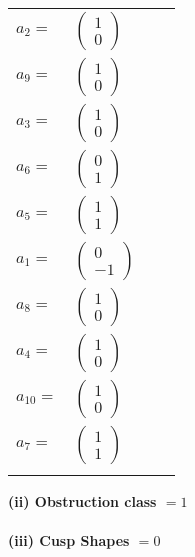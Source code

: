\documentclass[1p]{elsarticle_modified}
\theoremstyle{definition}
\begin{document}
\begin{tabular}{m{7pt} m{180pt} m{7pt} m{180pt} }
\flushright $a_{2}=$&$\begin{pmatrix}1\\0\end{pmatrix}$ \\
\flushright $a_{9}=$&$\begin{pmatrix}1\\0\end{pmatrix}$ \\
\flushright $a_{3}=$&$\begin{pmatrix}1\\0\end{pmatrix}$ \\
\flushright $a_{6}=$&$\begin{pmatrix}0\\1\end{pmatrix}$ \\
\flushright $a_{5}=$&$\begin{pmatrix}1\\1\end{pmatrix}$ \\
\flushright $a_{1}=$&$\begin{pmatrix}0\\-1\end{pmatrix}$ \\
\flushright $a_{8}=$&$\begin{pmatrix}1\\0\end{pmatrix}$ \\
\flushright $a_{4}=$&$\begin{pmatrix}1\\0\end{pmatrix}$ \\
\flushright $a_{10}=$&$\begin{pmatrix}1\\0\end{pmatrix}$ \\
\flushright $a_{7}=$&$\begin{pmatrix}1\\1\end{pmatrix}$\\&\end{tabular}
\flushleft \textbf{(ii) Obstruction class $= 1$}\\~\\
\flushleft \textbf{(iii) Cusp Shapes $= 0$}\\~\\
\newpage\renewcommand{\arraystretch}{1}
\end{document}
